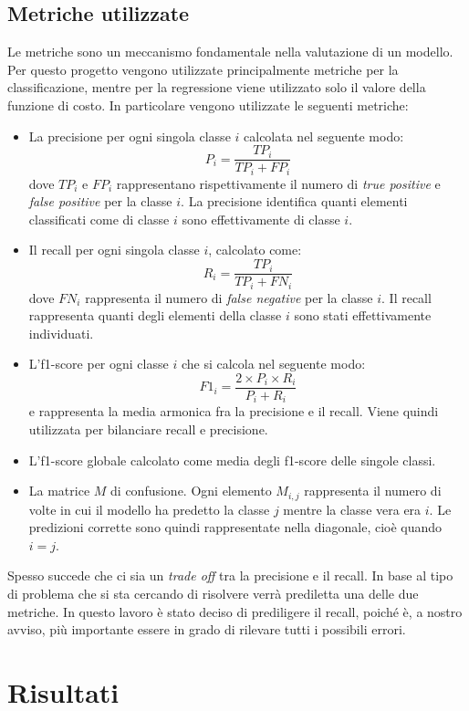 \subsection{Metriche utilizzate}\label{subsec:metriche}
Le metriche sono un meccanismo fondamentale nella valutazione di un modello. 
Per questo progetto vengono utilizzate principalmente metriche per la classificazione, mentre per la regressione viene utilizzato solo il valore della funzione di costo.
In particolare vengono utilizzate le seguenti metriche:
    \begin{itemize}
        \item La precisione per ogni singola classe $i$ calcolata nel seguente modo:
            \[P_i = \frac{TP_i}{TP_i + FP_i}\]
            dove $TP_i$ e $FP_i$ rappresentano rispettivamente il numero di \textit{true positive} e \textit{false positive} per la classe $i$.             
            La precisione identifica quanti elementi classificati come di classe $i$ sono effettivamente di classe $i$.
        \item Il recall per ogni singola classe $i$, calcolato come:
            \[R_i = \frac{TP_i}{TP_i + FN_i}\]
            dove $FN_i$ rappresenta il numero di \textit{false negative} per la classe $i$.
            Il recall rappresenta quanti degli elementi della classe $i$ sono stati effettivamente individuati.
        \item L'f1-score per ogni classe $i$ che si calcola nel seguente modo:
            \[F1_i = \frac{2 \times P_i \times R_i}{P_i + R_i}\]
            e rappresenta la media armonica fra la precisione e il recall. Viene quindi utilizzata per bilanciare recall e precisione.
        \item L'f1-score globale calcolato come media degli f1-score delle singole classi.
        \item La matrice $M$ di confusione. Ogni elemento $M_{i,j}$ rappresenta il numero di volte in cui il modello ha predetto la classe $j$ mentre la classe vera era $i$.
         Le predizioni corrette sono quindi rappresentate nella diagonale, cioè quando $i=j$.
    \end{itemize}
Spesso succede che ci sia un \textit{trade off} tra la precisione e il recall.
In base al tipo di problema che si sta cercando di risolvere verrà prediletta una delle due metriche.
In questo lavoro è stato deciso di prediligere il recall, poiché è, a nostro avviso, più importante essere in grado di rilevare tutti i possibili errori.

\section{Risultati}
